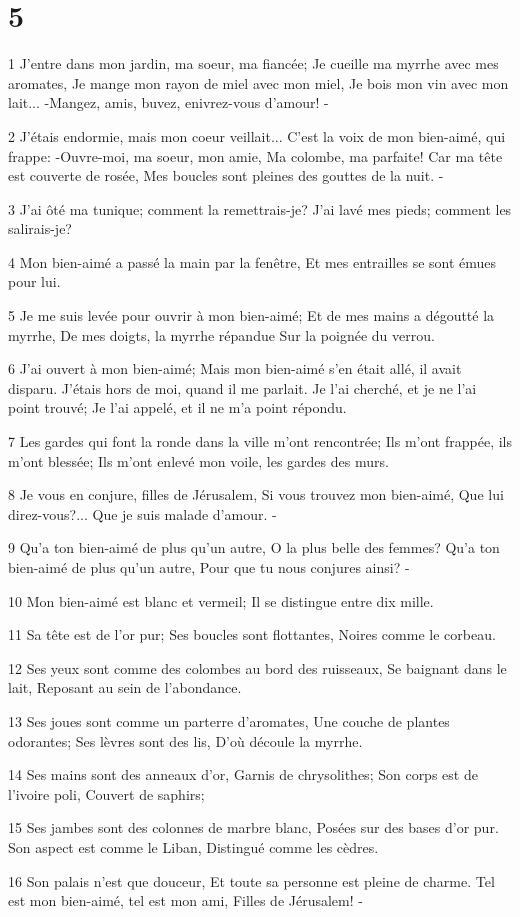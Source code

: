 \chapter{5}

\par 1 J'entre dans mon jardin, ma soeur, ma fiancée; Je cueille ma myrrhe avec mes aromates, Je mange mon rayon de miel avec mon miel, Je bois mon vin avec mon lait... -Mangez, amis, buvez, enivrez-vous d'amour! -
\par 2 J'étais endormie, mais mon coeur veillait... C'est la voix de mon bien-aimé, qui frappe: -Ouvre-moi, ma soeur, mon amie, Ma colombe, ma parfaite! Car ma tête est couverte de rosée, Mes boucles sont pleines des gouttes de la nuit. -
\par 3 J'ai ôté ma tunique; comment la remettrais-je? J'ai lavé mes pieds; comment les salirais-je?
\par 4 Mon bien-aimé a passé la main par la fenêtre, Et mes entrailles se sont émues pour lui.
\par 5 Je me suis levée pour ouvrir à mon bien-aimé; Et de mes mains a dégoutté la myrrhe, De mes doigts, la myrrhe répandue Sur la poignée du verrou.
\par 6 J'ai ouvert à mon bien-aimé; Mais mon bien-aimé s'en était allé, il avait disparu. J'étais hors de moi, quand il me parlait. Je l'ai cherché, et je ne l'ai point trouvé; Je l'ai appelé, et il ne m'a point répondu.
\par 7 Les gardes qui font la ronde dans la ville m'ont rencontrée; Ils m'ont frappée, ils m'ont blessée; Ils m'ont enlevé mon voile, les gardes des murs.
\par 8 Je vous en conjure, filles de Jérusalem, Si vous trouvez mon bien-aimé, Que lui direz-vous?... Que je suis malade d'amour. -
\par 9 Qu'a ton bien-aimé de plus qu'un autre, O la plus belle des femmes? Qu'a ton bien-aimé de plus qu'un autre, Pour que tu nous conjures ainsi? -
\par 10 Mon bien-aimé est blanc et vermeil; Il se distingue entre dix mille.
\par 11 Sa tête est de l'or pur; Ses boucles sont flottantes, Noires comme le corbeau.
\par 12 Ses yeux sont comme des colombes au bord des ruisseaux, Se baignant dans le lait, Reposant au sein de l'abondance.
\par 13 Ses joues sont comme un parterre d'aromates, Une couche de plantes odorantes; Ses lèvres sont des lis, D'où découle la myrrhe.
\par 14 Ses mains sont des anneaux d'or, Garnis de chrysolithes; Son corps est de l'ivoire poli, Couvert de saphirs;
\par 15 Ses jambes sont des colonnes de marbre blanc, Posées sur des bases d'or pur. Son aspect est comme le Liban, Distingué comme les cèdres.
\par 16 Son palais n'est que douceur, Et toute sa personne est pleine de charme. Tel est mon bien-aimé, tel est mon ami, Filles de Jérusalem! -

